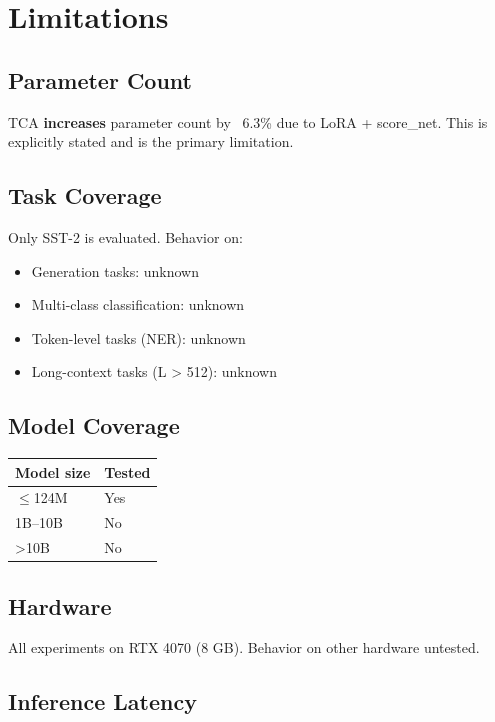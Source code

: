\section{Limitations}

\subsection{Parameter Count}

TCA \textbf{increases} parameter count by ~6.3\% due to LoRA + score\_net. This is 
explicitly stated and is the primary limitation.

\subsection{Task Coverage}

Only SST-2 is evaluated. Behavior on:
\begin{itemize}
\item Generation tasks: unknown
\item Multi-class classification: unknown
\item Token-level tasks (NER): unknown
\item Long-context tasks (L > 512): unknown

\end{itemize}
\subsection{Model Coverage}

\begin{table}[H]
\centering
\small
\begin{tabular}{ll}
\toprule
\textbf{Model size} & \textbf{Tested} \\
\midrule
$\le$124M & Yes \\
1B--10B & No \\
>10B & No \\
\bottomrule
\end{tabular}
\end{table}

\subsection{Hardware}

All experiments on RTX 4070 (8 GB). Behavior on other hardware untested.

\subsection{Inference Latency}

